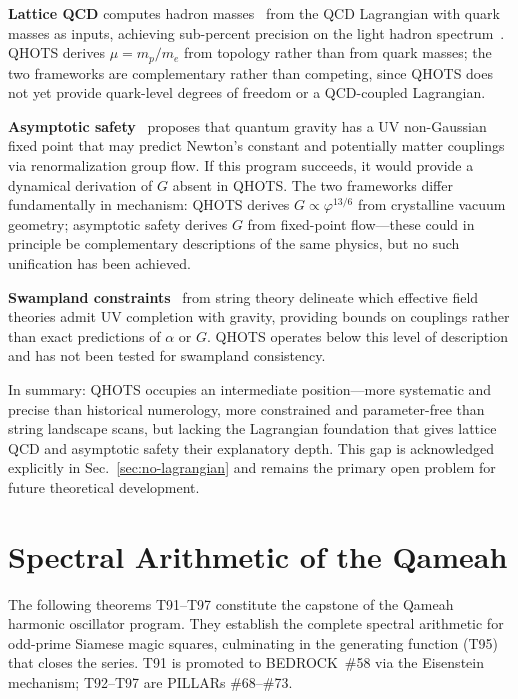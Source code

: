 \documentclass[aps,prd,twocolumn,superscriptaddress,floatfix,nofootinbib]{revtex4-2}
\theoremstyle{definition}
\theoremstyle{remark}
\newcommand{\vp}{\varphi}
\begin{document}
\textbf{Lattice QCD} computes hadron masses~\cite{lqcd2024} from the QCD
Lagrangian with quark masses as inputs, achieving sub-percent precision on the
light hadron spectrum~\cite{lqcd2025spec}. QHOTS derives $\mu = m_p/m_e$ from
topology rather than from quark masses; the two frameworks are complementary
rather than competing, since QHOTS does not yet provide quark-level degrees of
freedom or a QCD-coupled Lagrangian.

\textbf{Asymptotic safety}~\cite{percacci2017} proposes that quantum gravity
has a UV non-Gaussian fixed point that may predict Newton's constant and
potentially matter couplings via renormalization group flow. If this program
succeeds, it would provide a dynamical derivation of $G$ absent in QHOTS.
The two frameworks differ fundamentally in mechanism: QHOTS derives
$G \propto \vp^{13/6}$ from crystalline vacuum geometry; asymptotic safety
derives $G$ from fixed-point flow---these could in principle be complementary
descriptions of the same physics, but no such unification has been achieved.

\textbf{Swampland constraints}~\cite{vafa2005} from string theory delineate
which effective field theories admit UV completion with gravity, providing
bounds on couplings rather than exact predictions of $\alpha$ or $G$.
QHOTS operates below this level of description and has not been tested for
swampland consistency.

In summary: QHOTS occupies an intermediate position---more systematic and
precise than historical numerology, more constrained and parameter-free than
string landscape scans, but lacking the Lagrangian foundation that gives
lattice QCD and asymptotic safety their explanatory depth. This gap is
acknowledged explicitly in Sec.~\ref{sec:no-lagrangian} and remains the
primary open problem for future theoretical development.

\section{Spectral Arithmetic of the Qameah}
\label{sec:spectral-qameah}

The following theorems T91--T97 constitute the capstone of the Qameah
harmonic oscillator program.  They establish the complete spectral
arithmetic for odd-prime Siamese magic squares, culminating in the
generating function (T95) that closes the series.  T91 is promoted
to BEDROCK~\#58 via the Eisenstein mechanism; T92--T97 are PILLARs
\#68--\#73.
\end{document}
